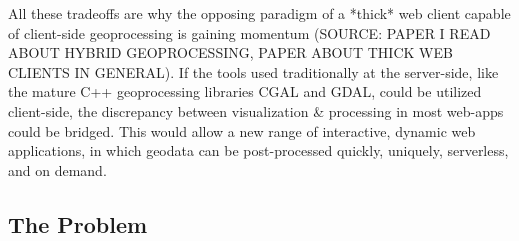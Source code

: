 



All these tradeoffs are why the opposing paradigm of a *thick* web client capable of client-side geoprocessing is gaining momentum (SOURCE: PAPER I READ ABOUT HYBRID GEOPROCESSING, PAPER ABOUT THICK WEB CLIENTS IN GENERAL). 
If the tools used traditionally at the server-side, like the mature C++ geoprocessing libraries CGAL and GDAL, could be utilized client-side, the discrepancy between visualization \& processing in most web-apps could be bridged. 
This would allow a new range of interactive, dynamic web applications, in which geodata can be post-processed quickly, uniquely, serverless, and on demand. 

\subsection*{The Problem}

